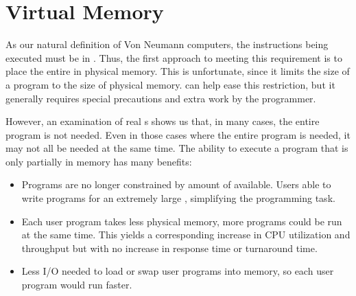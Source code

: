 \section{Virtual Memory}\label{sec:Virtual_Memory}
As our natural definition of Von Neumann computers, the instructions being executed must be in .
Thus, the first approach to meeting this requirement is to place the entire  in physical memory.
This is unfortunate, since it limits the size of a program to the size of physical memory.
 can help ease this restriction, but it generally requires special precautions and extra work by the programmer.

However, an examination of real s shows us that, in many cases, the entire program is not needed.
Even in those cases where the entire program is needed, it may not all be needed at the same time.
The ability to execute a program that is only partially in memory has many benefits:
\begin{itemize}[noitemsep]
\item Programs are no longer constrained by amount of  available.
  Users able to write programs for an extremely large , simplifying the programming task.
\item Each user program takes less physical memory, more programs could be run at the same time.
  This yields a corresponding increase in CPU utilization and throughput but with no increase in response time or turnaround time.
\item Less I/O needed to load or swap user programs into memory, so each user program would run faster.
\end{itemize}

